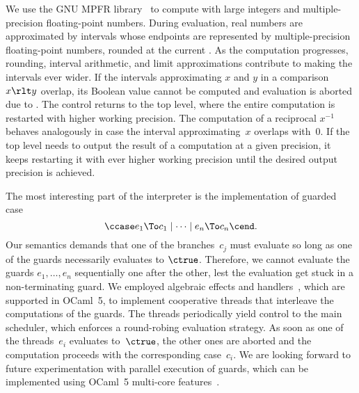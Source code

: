We use the GNU MPFR library~\cite{mpfr} to compute with large integers and multiple-precision floating-point numbers.
%
During evaluation, real numbers are approximated by intervals whose endpoints are represented by multiple-precision floating-point numbers, rounded at the current .
As the computation progresses, rounding, interval arithmetic, and limit approximations contribute to making the intervals ever wider.
If the intervals approximating $x$ and $y$ in a comparison $x \rlt y$ overlap, its Boolean value cannot be computed and evaluation is aborted due to . The control returns to the top level, where the entire computation is restarted with higher working precision. The computation of a reciprocal $x^{-1}$ behaves analogously in case the interval approximating~$x$ overlaps with~$0$.
%
If the top level needs to output the result of a computation at a given precision, it keeps restarting it with ever higher working precision until the desired output precision is achieved.

The most interesting part of the interpreter is the implementation of guarded case
%
\begin{equation*}
  \ccase e_1 \To c_1 \mid \cdots \mid e_n \To c_n \cend.
\end{equation*}
%
Our semantics demands that one of the branches~$c_j$ must evaluate so long as one of the guards necessarily evaluates to $\ctrue$. Therefore, we cannot evaluate the guards $e_1, \ldots, e_n$ sequentially one after the other, lest the evaluation get stuck in a non-terminating guard.
%
We employed algebraic effects and handlers~\cite{plotkin09:_handl_algeb_effec,bauer15:_progr}, which are supported in OCaml~5, to implement cooperative threads that interleave the computations of the guards. The threads periodically yield control to the main scheduler, which enforces a round-robing evaluation strategy.
%
As soon as one of the threads~$e_i$ evaluates to~$\ctrue$, the other ones are aborted and the computation proceeds with the corresponding case~$c_i$.
%
We are looking forward to future experimentation with parallel execution of guards, which can be implemented using OCaml~5 multi-core features~\cite{sivaramakrishnan22:_retrof_concur}.

